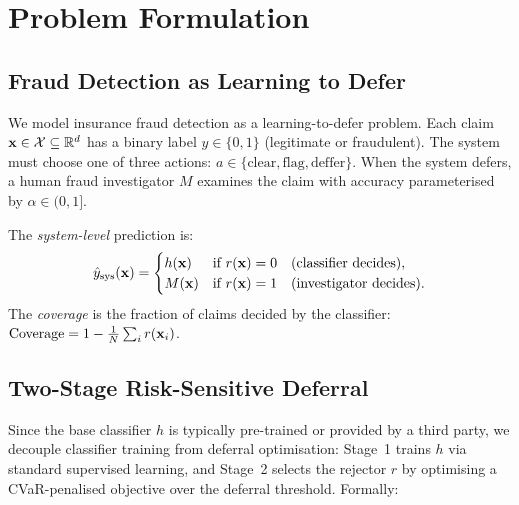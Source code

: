 \section{Problem Formulation}
\label{sec:formulation}

\subsection{Fraud Detection as Learning to Defer}
\label{sec:fraud_l2d}

We model insurance fraud detection as a learning-to-defer problem. Each claim $\mathbf{x} \in \mathcal{X} \subseteq \mathbb{R}^d$ has a binary label $y \in \{0, 1\}$ (legitimate or fraudulent). The system must choose one of three actions: $a \in \{\text{clear}, \text{flag}, \text{deffer}\}$. When the system defers, a human fraud investigator $M$ examines the claim with accuracy parameterised by $\alpha \in (0, 1]$.

The \textit{system-level} prediction is:
\begin{equation}
    \hat{y}_{\text{sys}}(\mathbf{x}) = \begin{cases}
        h(\mathbf{x}) & \text{if } r(\mathbf{x}) = 0 \quad (\text{classifier decides}), \\
        M(\mathbf{x}) & \text{if } r(\mathbf{x}) = 1 \quad (\text{investigator decides}).
    \end{cases}
\end{equation}
The \textit{coverage} is the fraction of claims decided by the classifier: $\text{Coverage} = 1 - \frac{1}{N}\sum_{i} r(\mathbf{x}_i)$.

\subsection{Two-Stage Risk-Sensitive Deferral}
\label{sec:risk_objective}

Since the base classifier $h$ is typically pre-trained or provided by a third party, we decouple classifier training from deferral optimisation: Stage~1 trains $h$ via standard supervised learning, and Stage~2 selects the rejector $r$ by optimising a CVaR-penalised objective over the deferral threshold. Formally:


